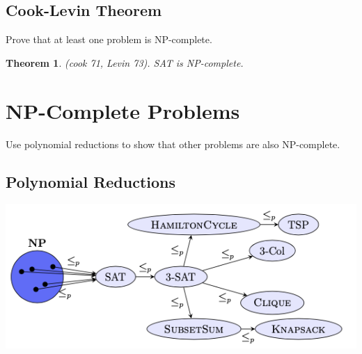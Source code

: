 \documentclass[a3paper, 8pt]{extarticle}
\newtheorem{theorem}{Theorem}[section]
\newtheorem{proposition}{Proposition}[section]
\newtheorem{lemma}[theorem]{Lemma}
\begin{document}
\begin{multicols*}{6}
\subsection{Cook-Levin Theorem}
Prove that at least one problem is NP-complete. 
\begin{theorem}
    (cook 71, Levin 73). SAT is NP-complete.
\end{theorem}
\section{NP-Complete Problems}
Use polynomial reductions to show that other problems are also NP-complete.

\subsection{Polynomial Reductions}
\begin{center}
    \includegraphics[width=0.8\columnwidth]{images/Screen Shot 2023-01-05 at 18.04.01.png}
\end{center}





\end{multicols*}
\end{document}
